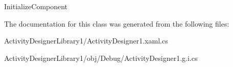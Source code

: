 Initialize\+Component 



The documentation for this class was generated from the following files\+:\begin{DoxyCompactItemize}
\item 
Activity\+Designer\+Library1/Activity\+Designer1.\+xaml.\+cs\item 
Activity\+Designer\+Library1/obj/\+Debug/Activity\+Designer1.\+g.\+i.\+cs\end{DoxyCompactItemize}

